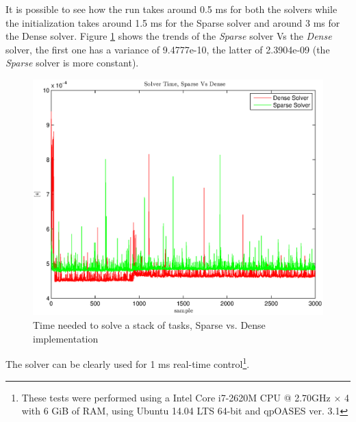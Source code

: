 It is possible to see how the run takes around 0.5 ms for both the solvers while the initialization takes around 1.5 ms for the Sparse solver and around 3 ms for the Dense solver. Figure \ref{solver_time} shows the trends of the \emph{Sparse} solver Vs the \emph{Dense} solver, the first one has a variance of 9.4777e-10, the latter of 2.3904e-09 (the \emph{Sparse} solver is more constant).
\begin{figure}[htb!]
\vspace{2 mm}
\centering 
\includegraphics[width=0.7\linewidth]{gfx/solverTime3.eps} 
\caption{Time needed to solve a stack of tasks, Sparse vs. Dense implementation} 
\label{solver_time}
\end{figure}
The solver can be clearly used for 1 ms real-time control\footnote{These tests were performed using a Intel Core i7-2620M CPU @ 2.70GHz × 4 with 6 GiB of RAM, using Ubuntu 14.04 LTS 64-bit and qpOASES ver. 3.1}.

